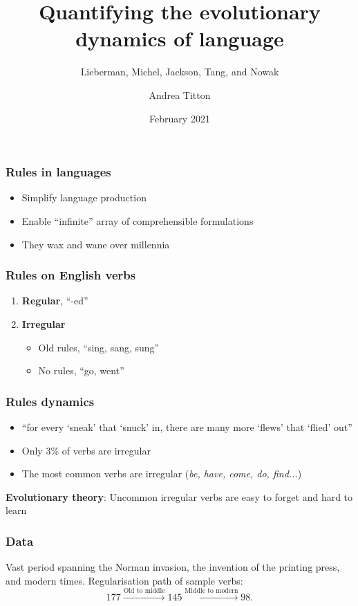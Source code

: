 \documentclass{beamer}
\title{Quantifying the evolutionary dynamics of language}
\subtitle{Lieberman, Michel, Jackson, Tang, and Nowak}
\author{Andrea Titton}
\date{February 2021}
\begin{document}
\frame{\titlepage}

\begin{frame}
    \frametitle{Rules in languages}

    \begin{itemize} \setlength\itemsep{2em}
        \item Simplify language production
        \item Enable ``infinite'' array of comprehensible formulations
        \item They wax and wane over millennia
    \end{itemize}
\end{frame}

\begin{frame}
    \frametitle{Rules on English verbs}

    \begin{enumerate}\setlength\itemsep{2em}
        \item \textbf{Regular}, ``-ed''
        \item \textbf{Irregular}
              \begin{itemize} \setlength\itemsep{1em}
                  \item Old rules, ``sing, sang, sung''
                  \item No rules, ``go, went''
              \end{itemize}
    \end{enumerate}
\end{frame}

\begin{frame}
    \frametitle{Rules dynamics}

    \begin{itemize}\setlength\itemsep{1em}
        \item  ``for every ‘sneak’ that ‘snuck’ in, there are many more ‘flews’ that ‘flied’ out''
        \item Only 3\% of verbs are irregular
        \item The most common verbs are irregular (\textit{be, have, come, do, find...})
    \end{itemize}

    \textbf{Evolutionary theory}: Uncommon irregular verbs are easy to forget and hard to learn
\end{frame}

\begin{frame}
    \frametitle{Data}
    Vast period spanning the Norman invasion, the invention of the printing press, and modern times. Regularisation path of sample verbs:
    \vspace{2em}
    \begin{equation}
        177 \xrightarrow{\text{Old to middle}} 145 \xrightarrow{\text{Middle to modern}} 98.
    \end{equation}

\end{frame}
\end{document}
